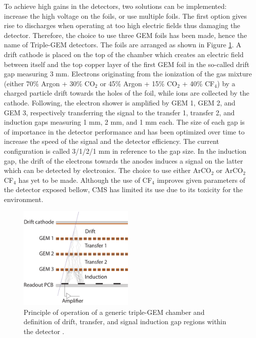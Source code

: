     To achieve high gains in the detectors, two solutions can be implemented: increase the high voltage on the foils, or use multiple foils. The first option gives rise to discharges when operating at too high electric fields thus damaging the detector. Therefore, the choice to use three GEM foils has been made, hence the name of Triple-GEM detectors. The foils are arranged as shown in Figure \ref{fig:II-1-triple}. A drift cathode is placed on the top of the chamber which creates an electric field between itself and the top copper layer of the first GEM foil in the so-called drift gap measuring 3 mm. Electrons originating from the ionization of the gas mixture (either 70\% Argon + 30\% CO$_2$ or 45\% Argon + 15\% CO$_2$ + 40\% CF$_4$) by a charged particle drift towards the holes of the foil, while ions are collected by the cathode. Following, the electron shower is amplified by GEM 1, GEM 2, and GEM 3, respectively transferring the signal to the transfer 1, transfer 2, and induction gaps measuring 1 mm, 2 mm, and 1 mm each. The size of each gap is of importance in the detector performance and has been optimized over time to increase the speed of the signal and the detector efficiency. The current configuration is called 3/1/2/1 mm in reference to the gap size. In the induction gap, the drift of the electrons towards the anodes induces a signal on the latter which can be detected by electronics. The choice to use either ArCO$_2$ or ArCO$_2$CF$_4$ has yet to be made. Although the use of CF$_4$ improves given parameters of the detector exposed bellow, CMS has limited its use due to its toxicity for the environment. \\

    \begin{figure}[h!]
      \centering
      \includegraphics[width=0.5\textwidth]{img/II-1-gem/triple-gem-foils.pdf}
      \caption{Principle of operation of a generic triple-GEM chamber and definition of drift, transfer, and signal induction gap regions within the detector \cite{Colaleo:2021453}.}
      \label{fig:II-1-triple}
    \end{figure}

